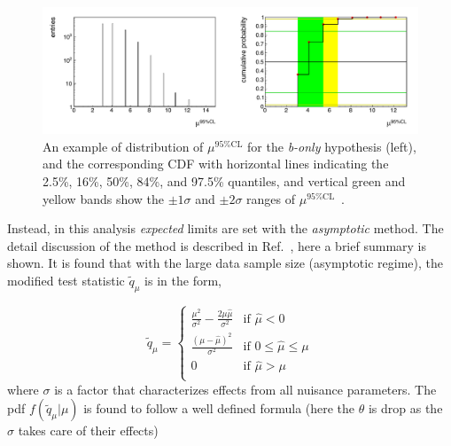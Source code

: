 	\begin{figure}[!ht]\begin{center}
	  \includegraphics[width=1.0\textwidth]{Fig/ExpectedLimit_Illustration}
	  \caption{An example of distribution of $\mu^{\text{95\%CL}}$ for the \emph{b-only} hypothesis (left), and the corresponding CDF with horizontal lines indicating the 2.5\%, 16\%, 50\%, 84\%, and 97.5\% quantiles, and vertical green and yellow bands show the $\pm1\sigma$ and $\pm2\sigma$ ranges of $\mu^{\text{95\%CL}}$~\cite{CLs_ref3}.}
	\label{fig:ExpLimit}\end{center}\end{figure}
	
	Instead, in this analysis \emph{expected} limits are set with the \emph{asymptotic} method. The detail discussion of the method is described in Ref.~\cite{Cowan:2010js}, here a brief summary is shown. It is found that with the large data sample size (asymptotic regime)\footnotemark, the modified test statistic $\tilde{q}_\mu$ is in the form,
	
	\[ \tilde{q}_{\mu} =
  \begin{cases}
  	\displaystyle
    \frac{\mu^2}{\sigma^2}-\frac{2\mu\hat{\mu}}{\sigma^2}       & \text{if } \hat{\mu}<0\\
    \displaystyle
    \frac{(\mu-\hat{\mu})^2}{\sigma^2}      & \text{if } 0\leq\hat{\mu}\leq\mu\\
    \displaystyle
    0  & \text{if } \hat{\mu}>\mu\\
  \end{cases}
\]
where $\sigma$ is a factor that characterizes effects from all nuisance parameters. The pdf $f(\tilde{q}_{\mu}|\mu)$ is found to follow a well defined formula (here the $\theta$ is drop as the $\sigma$ takes care of their effects)
	
